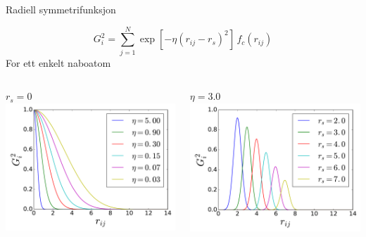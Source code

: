 \documentclass{beamer}
\begin{document}
\begin{frame}{Radiell symmetrifunksjon}

\begin{equation*}
 G_i^2 = \sum_{j=1}^N \exp[-\eta(r_{ij}-r_s)^2] \,f_c(r_{ij})
\end{equation*}
\newline
\centering
For ett enkelt naboatom
\begin{columns} %
  \begin{column}{0.5\linewidth} %
   \centering
   $r_s = 0$
   \includegraphics[width=\linewidth]{../Figures/Presentation/G2_1.pdf}
  \end{column}
  \begin{column}{0.5\linewidth} %
   \centering
   $\eta = 3.0$
   \includegraphics[width=\linewidth]{../Figures/Presentation/G2_2.pdf}
  \end{column}
\end{columns}

\end{frame}
\end{document}
